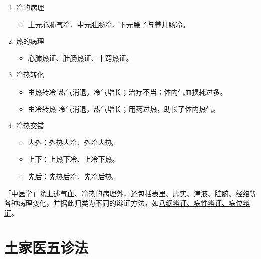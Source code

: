 \documentclass[cn,hazy,black,12pt,normal,founder]{elegantnote}
\begin{document}
\begin{enumerate}
  \item 冷的病理
  \begin{itemize}
    \item 上元心肺气冷、中元肚肠冷、下元腰子与养儿肠冷。
  \end{itemize}

  \item 热的病理
  \begin{itemize}
    \item 心肺热证、肚肠热证、十窍热证。
  \end{itemize}

  \item 冷热转化
  \begin{itemize}
    \item 由热转冷
    \subitem 热气消退，冷气增长；治疗不当；体内气血损耗过多。
    \item 由冷转热
    \subitem 冷气消退，热气增长；用药过热，助长了体内热气。
  \end{itemize}
  \item 冷热交错
  \begin{itemize}
    \item 内外：外热内冷、外冷内热。
    \item 上下：上热下冷、上冷下热。
    \item 先后：先热后冷、先冷后热。
  \end{itemize}
\end{enumerate}

\begin{note}
  「中医学」除上述气血、冷热的病理外，还包括\uline{表里、虚实、津液、脏腑、经络}等各种病理变化，并据此归类为不同的辩证方法，如\uline{八纲辨证、病性辨证、病位辩证}。
\end{note}

\section{土家医五诊法}
\end{document}
